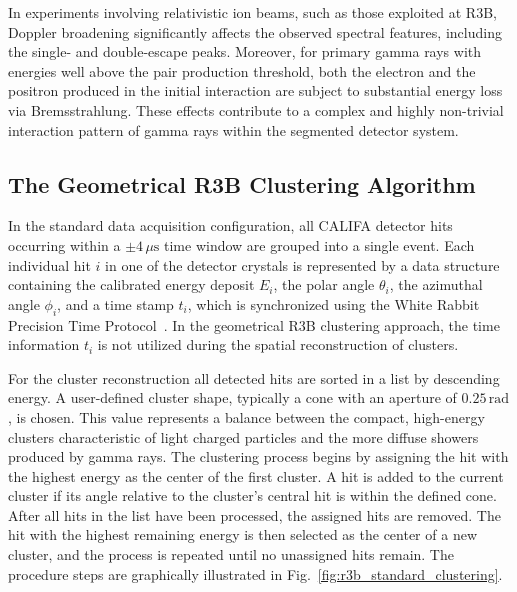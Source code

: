 In experiments involving relativistic ion beams, such as those exploited at R3B, Doppler broadening significantly affects the observed spectral features, including the single- and double-escape peaks. Moreover, for primary gamma rays with energies well above the pair production threshold, both the electron and the positron produced in the initial interaction are subject to substantial energy loss via Bremsstrahlung. These effects contribute to a complex and highly non-trivial interaction pattern of gamma rays within the segmented detector system.\newline


\subsection{The Geometrical R3B Clustering Algorithm}

In the standard data acquisition configuration, all CALIFA detector hits occurring within a $\pm 4\,\mu\mathrm{s}$ time window are grouped into a single event. Each individual hit \( i \) in one of the detector crystals is represented by a data structure containing the calibrated energy deposit \( E_i \), the polar angle \( \theta_i \), the azimuthal angle \( \phi_i \), and a time stamp \( t_i \), which is synchronized using the White Rabbit Precision Time Protocol~\cite{lipinski2011white}.\newline
In the geometrical R3B clustering approach, the time information $t_i$ is not utilized during the spatial reconstruction of clusters.\newline

For the cluster reconstruction all detected hits are sorted in a list by descending energy. A user-defined cluster shape, typically a cone with an aperture of $0.25\,\mathrm{rad}$, is chosen. This value represents a balance between the compact, high-energy clusters characteristic of light charged particles and the more diffuse showers produced by gamma rays.\newline
The clustering process begins by assigning the hit with the highest energy as the center of the first cluster. A hit is added to the current cluster if its angle relative to the cluster's central hit is within the defined cone. After all hits in the list have been processed, the assigned hits are removed. The hit with the highest remaining energy is then selected as the center of a new cluster, and the process is repeated until no unassigned hits remain. The procedure steps are graphically illustrated in Fig.~\ref{fig:r3b_standard_clustering}.

